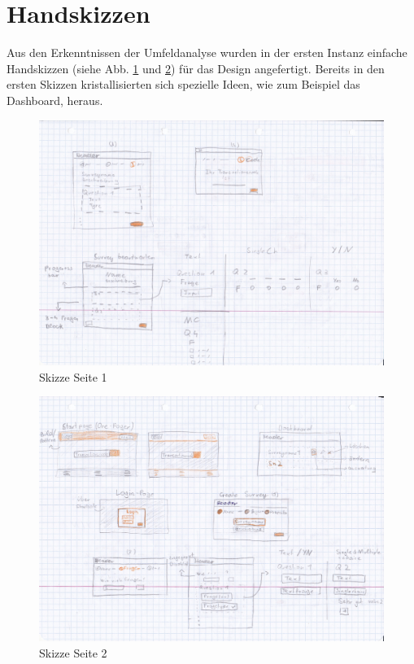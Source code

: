 \section{Handskizzen}

Aus den Erkenntnissen der Umfeldanalyse wurden in der ersten Instanz einfache Handskizzen (siehe Abb. \ref{fig:skizzen1} und \ref{fig:skizzen2}) für das Design angefertigt.
Bereits in den ersten Skizzen kristallisierten sich spezielle Ideen, wie zum Beispiel das Dashboard, heraus.

\begin{figure}[H]
    \includegraphics[width=1.0\textwidth]{pics/Handskizze.jpg}
    \centering
    \caption{Skizze Seite 1}
    \label{fig:skizzen1}
\end{figure}

\begin{figure}[H]
    \includegraphics[width=1.0\textwidth]{pics/Handskizze2.jpg}
    \centering
    \caption{Skizze Seite 2}
    \label{fig:skizzen2}
\end{figure}

